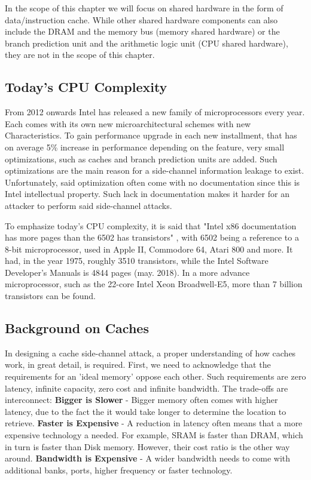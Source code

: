 In the scope of this chapter we will focus on shared hardware in the form of data/instruction cache. While other shared hardware components can also include the DRAM and the memory bus (memory shared hardware) or the branch prediction unit and the arithmetic logic unit (CPU shared hardware), they are not in the scope of this chapter.

\subsection{Today’s CPU Complexity}
From 2012 onwards Intel has released a new family of microprocessors every year. Each comes with its own new microarchitectural schemes with new Characteristics. To gain performance upgrade in each new installment, that has on average 5\% increase in performance depending on the feature, very small optimizations, such as caches and branch prediction units are added. Such optimizations are the main reason for a side-channel information leakage to exist. Unfortunately, said optimization often come with no documentation since this is Intel intellectual property. Such lack in documentation makes it harder for an attacker to perform said side-channel attacks.

To emphasize today's CPU complexity, it is said that "Intel x86 documentation has more pages than the 6502 has transistors" \cite{IntMan}, with 6502 being a reference to a 8-bit microprocessor, used in Apple II, Commodore 64, Atari 800 and more. It had, in the year 1975, roughly 3510 transistors, while the Intel Software Developer's Manuals is 4844 pages (may. 2018). In a more advance microprocessor, such as the 22-core Intel Xeon Broadwell-E5, more than 7 billion transistors can be found. 

\subsection{Background on Caches}
In designing a cache side-channel attack, a proper understanding of how caches work, in great detail, is required. First, we need to acknowledge that the requirements for an 'ideal memory' oppose each other. Such requirements are zero latency, infinite capacity, zero cost and infinite bandwidth. The trade-offs are interconnect: \textbf{Bigger is Slower} - Bigger memory often comes with higher latency, due to the fact the it would take longer to determine the location to retrieve.  \textbf{Faster is Expensive} - A reduction in latency often means that a more expensive technology a needed. For example, SRAM is faster than DRAM, which in turn is faster than Disk memory. However, their cost ratio is the other way around. \textbf{Bandwidth is Expensive} - A wider bandwidth needs to come with additional banks, ports, higher frequency or faster technology. 

